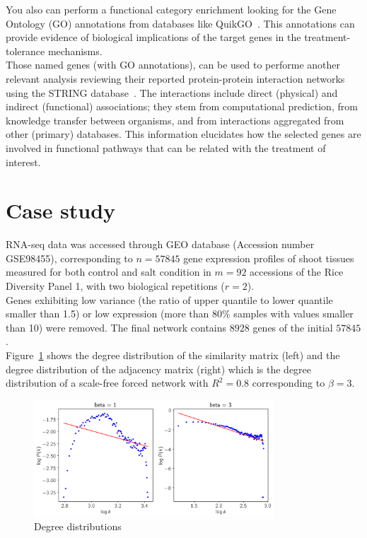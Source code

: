 \documentclass[12pt,journal, onecolumn]{IEEEtran}
\begin{document}
You also can perform a functional category enrichment looking for the Gene Ontology (GO) annotations from databases like QuikGO~\cite{binns2009quickgo}. This annotations can provide evidence of biological implications of the target genes in the treatment-tolerance mechanisms.\\

Those named genes (with GO annotations), can be used to performe another relevant analysis reviewing their reported protein-protein interaction networks using the STRING database~\cite{szklarczyk2016string}. The interactions include direct (physical) and indirect (functional) associations; they stem from computational prediction, from knowledge transfer between organisms, and from interactions aggregated from other (primary) databases. This information elucidates how the selected genes are involved in functional pathways that can be related with the treatment of interest.

\section{Case study}
RNA-seq data was accessed through GEO database \cite{GEOAcces90:online} (Accession number GSE98455), corresponding to $n=57845$ gene expression profiles of shoot tissues measured for both control and salt condition in $m=92$ accessions of the Rice Diversity Panel 1, with two biological repetitions ($r=2$). \\

Genes exhibiting low variance (the ratio of upper quantile to lower quantile smaller than 1.5) or low expression (more than 80\% samples with values smaller than 10) were removed. The final network contains $8928$ genes of the initial $57845$.\\

Figure~\ref{fig:beta} shows the degree distribution of the similarity matrix (left) and the degree distribution of the adjacency matrix (right) which is the degree distribution of a scale-free forced network with $R^2 = 0.8$ corresponding to $\beta = 3$.

\begin{figure}[h]
  \centering
    \includegraphics[clip,width=0.8\textwidth]{Figures/pick_beta.png}
  \caption{Degree distributions}
  \label{fig:beta}
\end{figure}
\end{document}
